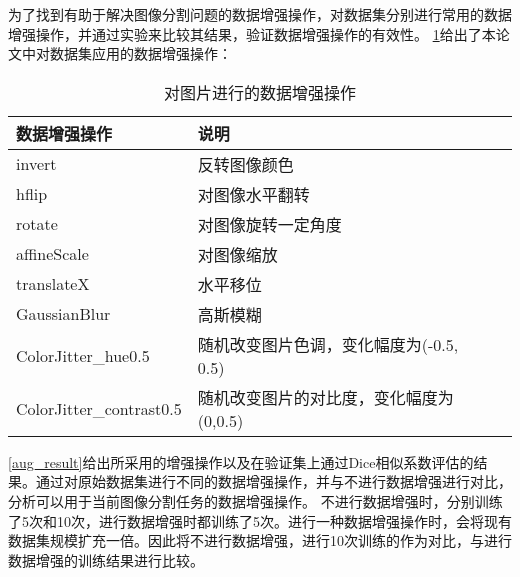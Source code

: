 \documentclass[AutoFakeBold]{LZUThesis}
\begin{document}
为了找到有助于解决图像分割问题的数据增强操作，对数据集分别进行常用的数据增强操作，并通过实验来比较其结果，验证数据增强操作的有效性。
\cref{dataaugmentation}给出了本论文中对数据集应用的数据增强操作：
\renewcommand\arraystretch{1.5} %
\begin{table}[htbp] %
    \setlength{\abovecaptionskip}{0cm}
    \setlength{\belowcaptionskip}{0.2cm}
    \centering
    \caption{对图片进行的数据增强操作}
    \label{dataaugmentation}
    \begin{tabular}{p{5cm}<{\centering}p{8cm}<{\centering}p{2.3cm}<{\centering}} %
        \hline
        数据增强操作             & 说明                                    \\
        \hline
        invert                   & 反转图像颜色                            \\
        hflip                    & 对图像水平翻转                          \\
        rotate                   & 对图像旋转一定角度                      \\
        affineScale              & 对图像缩放                              \\
        translateX               & 水平移位                                \\
        GaussianBlur             &
        高斯模糊                                                           \\
        ColorJitter\_hue0.5      & 随机改变图片色调，变化幅度为(-0.5, 0.5) \\
        ColorJitter\_contrast0.5 & 随机改变图片的对比度，变化幅度为(0,0.5) \\
        \hline
    \end{tabular}
\end{table}

\cref{aug_result}给出所采用的增强操作以及在验证集上通过Dice相似系数评估的结果。通过对原始数据集进行不同的数据增强操作，并与不进行数据增强进行对比，分析可以用于当前图像分割任务的数据增强操作。
不进行数据增强时，分别训练了5次和10次，进行数据增强时都训练了5次。进行一种数据增强操作时，会将现有数据集规模扩充一倍。因此将不进行数据增强，进行10次训练的作为对比，与进行数据增强的训练结果进行比较。
\end{document}
